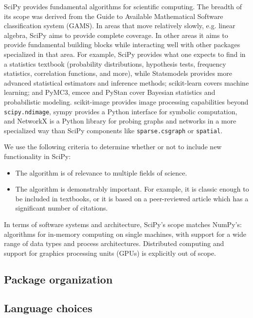 \documentclass[fleqn,10pt]{wlscirep}
\begin{document}
SciPy provides fundamental algorithms for scientific computing. The
breadth of its scope was derived from the Guide to Available Mathematical
Software classification system (GAMS\cite{boisvert1991guide}). In areas
that move relatively slowly, e.g. linear algebra, SciPy aims to provide
complete coverage. In other areas it aims to provide fundamental building
blocks while interacting well with other packages specialized in that area.
For example, SciPy provides what one expects to find in a
statistics textbook (probability distributions, hypothesis tests, frequency
statistics, correlation functions, and more), while 
Statsmodels\cite{statsmodels2010} provides
more advanced statistical estimators and inference methods;
scikit-learn\cite{pedregosa2011scikit} covers machine learning; and
PyMC3\cite{10.7717/peerj-cs.55}, emcee\cite{2013PASP-emcee} and 
PyStan\cite{pystan-ref} cover Bayesian statistics and probabilistic modeling.
scikit-image\cite{vanderwalt2014scikit} provides image processing
capabilities beyond \texttt{scipy.ndimage}, sympy\cite{meurer2017sympy}
provides a Python interface for symbolic computation, and
NetworkX\cite{hagberg2008networkx} is a Python library for probing
graphs and networks in a more specialized way than SciPy components
like \texttt{sparse.csgraph} or \texttt{spatial}.

We use the following criteria to determine whether or not to include new
functionality in SciPy:
\begin{itemize}
    \item The algorithm is of relevance to multiple fields of science.
    \item The algorithm is demonstrably important.  For example, it is classic
    enough to be included in textbooks, or it is based on a peer-reviewed article
    which has a significant number of citations.
\end{itemize}

In terms of software systems and architecture, SciPy's scope matches NumPy's:
algorithms for in-memory computing on single machines, with support for a wide
range of data types and process architectures. Distributed computing and support
for graphics processing units (GPUs) is explicitly out of scope.

\subsection*{Package organization}


\subsection*{Language choices}
\end{document}
